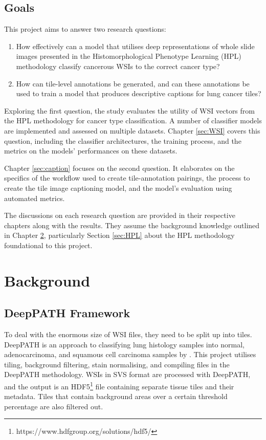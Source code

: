 \documentclass{l4proj}
\begin{document}
\section{Goals}
This project aims to answer two research questions:
\begin{enumerate}
    \item How effectively can a model that utilises deep representations of whole slide images presented in the Histomorphological Phenotype Learning (HPL) methodology classify cancerous WSIs to the correct cancer type?

    \item How can tile-level annotations be generated, and can these annotations be used to train a model that produces descriptive captions for lung cancer tiles?

\end{enumerate}

Exploring the first question, the study evaluates the utility of WSI vectors from the HPL methodology for cancer type classification. A number of classifier models are implemented and assessed on multiple datasets. Chapter \ref{sec:WSI} covers this question, including the classifier architectures, the training process, and the metrics on the models' performances on these datasets.

Chapter \ref{sec:caption} focuses on the second question. It elaborates on the specifics of the workflow used to create tile-annotation pairings, the process to create the tile image captioning model, and the model's evaluation using automated metrics.

The discussions on each research question are provided in their respective chapters along with the results. They assume the background knowledge outlined in Chapter \ref{sec:background}, particularly Section \ref{sec:HPL} about the HPL methodology foundational to this project.

\chapter{Background} \label{sec:background}

\section{DeepPATH Framework} \label{sec:deeppath}
To deal with the enormous size of WSI files, they need to be split up into tiles. DeepPATH is an approach to classifying lung histology samples into normal, adenocarcinoma, and squamous cell carcinoma samples by \cite{Coudray2018}. This project utilises tiling, background filtering, stain normalising, and compiling files in the DeepPATH methodology. WSIs in SVS format are processed with DeepPATH, and the output is an HDF5\footnote{https://www.hdfgroup.org/solutions/hdf5/} file containing separate tissue tiles and their metadata. Tiles that contain background areas over a certain threshold percentage are also filtered out.
\end{document}
